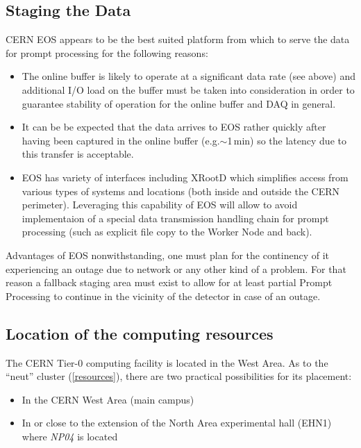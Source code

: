 \documentclass[pdftex,12pt,letter]{article}
\newcommand{\xrd}{XRootD\xspace}
\newcommand{\expname}{\textit{NP04}\xspace}
\newcommand{\PP}{Prompt Processing\xspace}
\begin{document}
\subsection{Staging the Data}
\label{sec:staging}
CERN EOS appears to be the best suited platform from which to
serve the data for prompt processing for the following reasons:
\begin{itemize}

\item The online buffer is likely to operate at a significant data rate (see above) and additional I/O load on the
buffer must be taken into consideration in order to guarantee stability of
operation for the online buffer and DAQ in general.

\item It can be be expected that the data arrives to EOS rather quickly after having been captured in the online buffer
(e.g.$\sim$1\,min) so the latency due to this transfer is acceptable.

\item EOS has variety of interfaces including \xrd \cite{xrootd} which simplifies access from various types of
systems and  locations (both inside and outside the CERN perimeter). Leveraging this capability of EOS will
allow to avoid implementaion of a special data transmission handling chain for prompt processing
(such as explicit file copy to the Worker Node and back).

\end{itemize}

\noindent Advantages of EOS nonwithstanding, one must plan for the continency of it experiencing
an outage due to network or any other kind of a problem. For that reason a fallback staging area
must exist to allow for at least partial \PP to continue in the vicinity of the detector in case of
an outage.

\subsection{Location of the computing resources}
The CERN Tier-0 computing facility is located in the West Area. As to the ``neut'' cluster (\ref{resources}),
there are two practical possibilities for its placement:
\begin{itemize}
\item In the CERN West Area (main campus)
\item In or close to the extension of the North Area experimental hall (EHN1) where \expname is located
\end{itemize}
\end{document}
